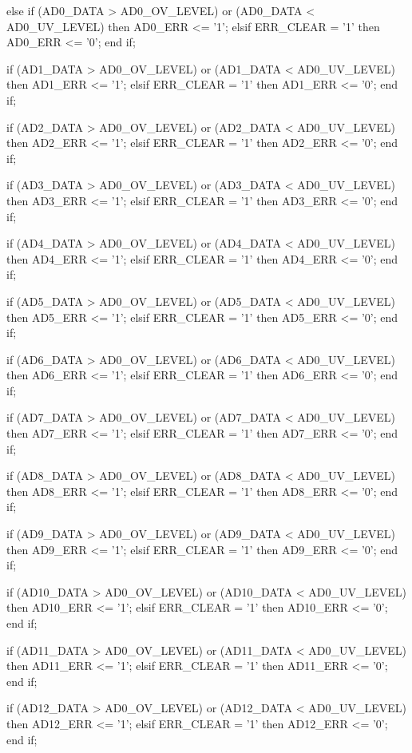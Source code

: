 \begin{mylisting}[language=VHDL,caption=AD変換モジュール,label=appF_ADC_module_VHDL]
			else
				if (AD0_DATA > AD0_OV_LEVEL) or (AD0_DATA < AD0_UV_LEVEL) then
					AD0_ERR	<= '1';
				elsif ERR_CLEAR = '1' then
					AD0_ERR	<= '0';
				end if;
				
				if (AD1_DATA > AD0_OV_LEVEL) or (AD1_DATA < AD0_UV_LEVEL) then
					AD1_ERR	<= '1';
				elsif ERR_CLEAR = '1' then
					AD1_ERR	<= '0';
				end if;
				
				if (AD2_DATA > AD0_OV_LEVEL) or (AD2_DATA < AD0_UV_LEVEL) then
					AD2_ERR	<= '1';
				elsif ERR_CLEAR = '1' then
					AD2_ERR	<= '0';
				end if;
				
				if (AD3_DATA > AD0_OV_LEVEL) or (AD3_DATA < AD0_UV_LEVEL) then
					AD3_ERR	<= '1';
				elsif ERR_CLEAR = '1' then
					AD3_ERR	<= '0';
				end if;
				
				if (AD4_DATA > AD0_OV_LEVEL) or (AD4_DATA < AD0_UV_LEVEL) then
					AD4_ERR	<= '1';
				elsif ERR_CLEAR = '1' then
					AD4_ERR	<= '0';
				end if;
				
				if (AD5_DATA > AD0_OV_LEVEL) or (AD5_DATA < AD0_UV_LEVEL) then
					AD5_ERR	<= '1';
				elsif ERR_CLEAR = '1' then
					AD5_ERR	<= '0';
				end if;
				
				if (AD6_DATA > AD0_OV_LEVEL) or (AD6_DATA < AD0_UV_LEVEL) then
					AD6_ERR	<= '1';
				elsif ERR_CLEAR = '1' then
					AD6_ERR	<= '0';
				end if;
				
				if (AD7_DATA > AD0_OV_LEVEL) or (AD7_DATA < AD0_UV_LEVEL) then
					AD7_ERR	<= '1';
				elsif ERR_CLEAR = '1' then
					AD7_ERR	<= '0';
				end if;
				
				if (AD8_DATA > AD0_OV_LEVEL) or (AD8_DATA < AD0_UV_LEVEL) then
					AD8_ERR	<= '1';
				elsif ERR_CLEAR = '1' then
					AD8_ERR	<= '0';
				end if;
				
				if (AD9_DATA > AD0_OV_LEVEL) or (AD9_DATA < AD0_UV_LEVEL) then
					AD9_ERR	<= '1';
				elsif ERR_CLEAR = '1' then
					AD9_ERR	<= '0';
				end if;
				
				
				
				if (AD10_DATA > AD0_OV_LEVEL) or (AD10_DATA < AD0_UV_LEVEL) then
					AD10_ERR	<= '1';
				elsif ERR_CLEAR = '1' then
					AD10_ERR	<= '0';
				end if;
				
				if (AD11_DATA > AD0_OV_LEVEL) or (AD11_DATA < AD0_UV_LEVEL) then
					AD11_ERR	<= '1';
				elsif ERR_CLEAR = '1' then
					AD11_ERR	<= '0';
				end if;
				
				if (AD12_DATA > AD0_OV_LEVEL) or (AD12_DATA < AD0_UV_LEVEL) then
					AD12_ERR	<= '1';
				elsif ERR_CLEAR = '1' then
					AD12_ERR	<= '0';
				end if;
				

\end{mylisting}
